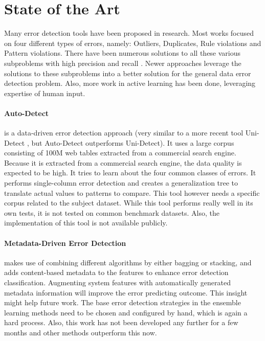 \section{State of the Art}

Many error detection tools have been proposed in research. Most works focused on four different types of errors, namely: Outliers, Duplicates, Rule violations and Pattern violations. There have been numerous solutions to all these various subproblems with high precision and recall \cite{Abedjan2016-qp}. 
Newer approaches leverage the solutions to these subproblems into a better solution for the general data error detection problem. Also, more work in active learning has been done, leveraging expertise of human input.

\paragraph{Auto-Detect \cite{Wang2019-jg}} is a data-driven error detection approach (very similar to a more recent tool Uni-Detect \cite{Huang2018-er}, but Auto-Detect outperforms Uni-Detect). It uses a large corpus consisting of 100M web tables extracted from a commercial search engine. Because it is extracted from a commercial search engine, the data quality is expected to be high. It tries to learn about the four common classes of errors. It performs single-column error detection and creates a generalization tree to translate actual values to patterns to compare. This tool however needs a specific corpus related to the subject dataset. While this tool performs really well in its own tests, it is not tested on common benchmark datasets. Also, the implementation of this tool is not available publicly.

\paragraph{Metadata-Driven Error Detection \cite{Visengeriyeva2018-qz}} makes use of combining different algorithms by either bagging or stacking, and adds content-based metadata to the features to enhance error detection classification. Augmenting system features with automatically generated metadata information will improve the error predicting outcome. This insight might help future work. The base error detection strategies in the ensemble learning methods need to be chosen and configured by hand, which is again a hard process. Also, this work has not been developed any further for a few months and other methods outperform this now.

